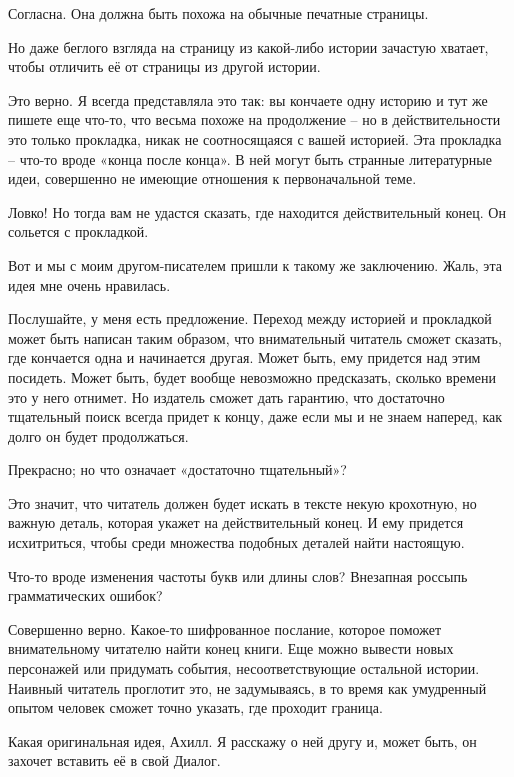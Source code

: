 \documentclass[../main.tex]{subfiles}
\begin{document}
\begin{dialogue}
 Согласна. Она должна быть похожа на обычные печатные страницы.

 Но даже беглого взгляда на страницу из какой-либо истории зачастую хватает, чтобы отличить её от страницы из другой истории.

 Это верно. Я всегда представляла это так: вы кончаете одну историю и тут же пишете еще что-то, что весьма похоже на продолжение \--- но в действительности это только прокладка, никак не соотносящаяся с вашей историей. Эта прокладка \--- что-то вроде «конца после конца». В ней могут быть странные литературные идеи, совершенно не имеющие отношения к первоначальной теме.

 Ловко! Но тогда вам не удастся сказать, где находится действительный конец. Он сольется с прокладкой.

 Вот и мы с моим другом-писателем пришли к такому же заключению. Жаль, эта идея мне очень нравилась.

 Послушайте, у меня есть предложение. Переход между историей и прокладкой может быть написан таким образом, что внимательный читатель сможет сказать, где кончается одна и начинается другая. Может быть, ему придется над этим посидеть. Может быть, будет вообще невозможно предсказать, сколько времени это у него отнимет. Но издатель сможет дать гарантию, что достаточно тщательный поиск всегда придет к концу, даже если мы и не знаем наперед, как долго он будет продолжаться.

 Прекрасно; но что означает «достаточно тщательный»?

 Это значит, что читатель должен будет искать в тексте некую крохотную, но важную деталь, которая укажет на действительный конец. И ему придется исхитриться, чтобы среди множества подобных деталей найти настоящую.

 Что-то вроде изменения частоты букв или длины слов? Внезапная россыпь грамматических ошибок?

 Совершенно верно. Какое-то шифрованное послание, которое поможет внимательному читателю найти конец книги. Еще можно вывести новых персонажей или придумать события, несоответствующие остальной истории. Наивный читатель проглотит это, не задумываясь, в то время как умудренный опытом человек сможет точно указать, где проходит граница.

 Какая оригинальная идея, Ахилл. Я расскажу о ней другу и, может быть, он захочет вставить её в свой Диалог.


\end{dialogue}
\end{document}
